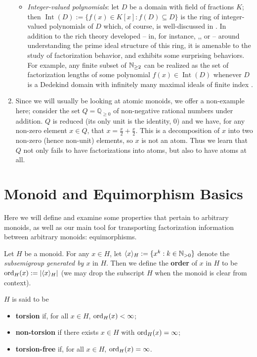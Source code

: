 \begin{enumerate}[label={\rm (\roman{*})}]
\begin{itemize}
\item \textit{Integer-valued polynomials}: let $D$ be a domain with field of fractions $K$; then $\operatorname{Int}(D) := \{f(x) \in K[x]: f(D) \subseteq D \}$ is the ring of integer-valued polynomials of $D$ which, of course, is well-discussed in \cite{cahen-chabert97}.
In addition to the rich theory developed -- in, for instance, \cite{loper97a},\cite{loper97b}, or \cite{chapman-loper-smith02} -- around understanding the prime ideal structure of this ring, it is amenable to the study of factorization behavior, and exhibits some surprising behaviors.  
For example, any finite subset of $\mathbb{N}_{\ge2}$ can be realized as the set of factorization lengths of some polynomial $f(x)\in \operatorname{Int}(D)$ whenever $D$ is a Dedekind domain with infinitely many maximal ideals of finite index \cite{frisch-al19,frisch13}.
\end{itemize}
\item Since we will usually be looking at atomic monoids, we offer a non-example here; consider the set $Q = \mathbb{Q}_{\ge 0}$ of non-negative rational numbers under addition.
$Q$ is reduced (its only unit is the identity, $0$) and we have, for any non-zero element $x\in Q$, that $x = \frac{x}{2} + \frac{x}{2}$.
This is a decomposition of $x$ into two non-zero (hence non-unit) elements, so $x$ is not an atom.
Thus we learn that $Q$ not only fails to have factorizations into atoms, but also to have atoms at all.
\end{enumerate}

\section{Monoid and Equimorphism Basics} \label{sec:monoids}
Here we will define and examine some properties that pertain to arbitrary monoids, as well as our main tool for transporting factorization information between arbitrary monoids: equimorphisms.



\begin{defn} \label{def:torsion}
	Let $H$ be a monoid.
	For any $x\in H$, let $\langle x \rangle_H := \{x^k: k\in \mathbb{N}_{>0} \}$ denote the \textit{subsemigroup generated by $x$} in $H$.
	Then we define the \textbf{order} of $x$ in $H$ to be ${\operatorname{ord}}_H(x) := | \langle x \rangle_H|$ (we may drop the subscript $H$ when the monoid is clear from context).
	
	$H$ is said to be
	\begin{itemize}
		\item \textbf{torsion} if, for all $x\in H$, ${\operatorname{ord}}_H(x)<\infty$;
		\item \textbf{non-torsion} if there exists $x\in H$ with ${\operatorname{ord}}_H(x) = \infty$;
		\item \textbf{torsion-free} if, for all $x\in H$, ${\operatorname{ord}}_H(x) = \infty$.
	\end{itemize}
\end{defn}

